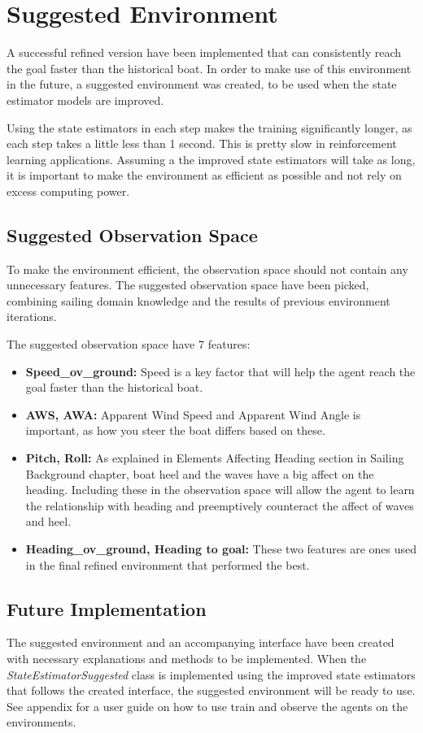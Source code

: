 \documentclass[12pt,twoside]{report}
\begin{document}
\section{Suggested Environment}
A successful refined version have been implemented that can consistently reach the goal faster than the historical boat. In order to make use of this environment in the future, a suggested environment was created, to be used when the state estimator models are improved.

Using the state estimators in each step makes the training significantly longer, as each step takes a little less than 1 second. This is pretty slow in reinforcement learning applications. Assuming a the improved state estimators will take as long, it is important to make the environment as efficient as possible and not rely on excess computing power.

\subsection{Suggested Observation Space}
To make the environment efficient, the observation space should not contain any unnecessary features. The suggested observation space have been picked, combining sailing domain knowledge and the results of previous environment iterations.

The suggested observation space have 7 features:
\begin{itemize}
    \item \textbf{Speed\_ov\_ground:} Speed is a key factor that will help the agent reach the goal faster than the historical boat.
    \item \textbf{AWS, AWA:} Apparent Wind Speed and Apparent Wind Angle is important, as how you steer the boat differs based on these.
    \item \textbf{Pitch, Roll:} As explained in Elements Affecting Heading section in Sailing Background chapter, boat heel and the waves have a big affect on the heading. Including these in the observation space will allow the agent to learn the relationship with heading and preemptively counteract the affect of waves and heel.
    \item \textbf{Heading\_ov\_ground, Heading to goal:} These two features are ones used in the final refined environment that performed the best.
\end{itemize}

\subsection{Future Implementation}
The suggested environment and an accompanying interface have been created with necessary explanations and methods to be implemented. When the \textit{StateEstimatorSuggested} class is implemented using the improved state estimators that follows the created interface, the suggested environment will be ready to use. See appendix for a user guide on how to use train and observe the agents on the environments.
\end{document}

